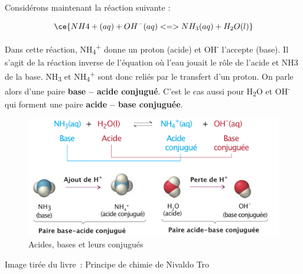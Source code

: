 \documentclass[
  11pt,
  french,
  a4paper,
  openany]{book}
\newenvironment{credit}
  {\vspace{-2em}\begin{center}\begin{footnotesize}\begin{textit}}
  {\end{textit}\end{footnotesize}\end{center}}
\begin{document}
Considérons maintenant la réaction suivante :

\[
\ce{NH4+(aq) + OH^{-}(aq) <=> NH_3(aq) + H_2O(l)}
\]

Dans cette réaction, NH\textsubscript{4}\textsuperscript{+} donne un proton (acide) et OH\textsuperscript{-} l'accepte (base). Il s'agit de la réaction inverse de l'équation où l'eau jouait le rôle de l'acide et NH3 de la base. NH\textsubscript{3} et NH\textsubscript{4}\textsuperscript{+} sont donc reliés par le transfert d'un proton. On parle alors d'une paire \textbf{base -- acide conjugué}. C'est le cas aussi pour H\textsubscript{2}O et OH\textsuperscript{-} qui forment une paire \textbf{acide -- base conjuguée}.


\begin{figure}

{\centering \includegraphics[width=0.9\linewidth]{images/acides-bases-1} 

}

\caption{Acides, bases et leurs conjugués}\label{fig:acides-bases-1}
\end{figure}

\begin{credit}
Image tirée du livre~: Principe de chimie de Nivaldo Tro

\end{credit}


\clearpage
\end{document}
